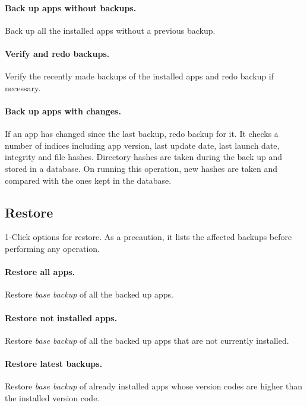 \paragraph{Back up apps without backups.} Back up all the installed apps without a previous backup.

\paragraph{Verify and redo backups.} Verify the recently made backups of the installed apps and redo backup if necessary.

\paragraph{Back up apps with changes.} If an app has changed since the last backup, redo backup for it.
It checks a number of indices including app version, last update date, last launch date, integrity and file hashes.
Directory hashes are taken during the back up and stored in a database.
On running this operation, new hashes are taken and compared with the ones kept in the database.

\subsection{Restore}\label{subsec:1-click-restore} %
1-Click options for restore.
As a precaution, it lists the affected backups before performing any operation.

\paragraph{Restore all apps.} Restore \textit{base backup} of all the backed up apps.

\paragraph{Restore not installed apps.} Restore \textit{base backup} of all the backed up apps that are not currently installed.

\paragraph{Restore latest backups.} Restore \textit{base backup} of already installed apps whose version codes are higher than the installed version code.
